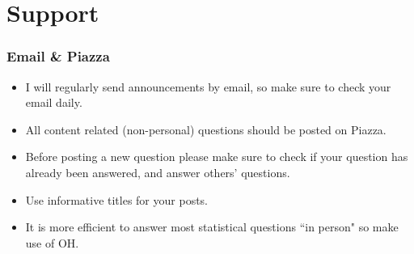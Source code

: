 \documentclass[slidestop,compress,mathserif,12pt,t,professionalfonts,xcolor=table]{beamer}
\begin{document}

\section{Support}


\begin{frame}
\frametitle{Email \& Piazza}

\begin{itemize}

\item I will regularly send announcements by email, so make sure to check your email  
daily.

\item All content related (non-personal) questions should be posted on Piazza.

\item Before posting a new question please make sure to check if your question has 
already been answered, and answer others' questions.

\item Use informative titles for your posts.

\item It is more efficient to answer most statistical questions ``in person" so make 
use of OH.

\end{itemize}

\end{frame}

\end{document}
